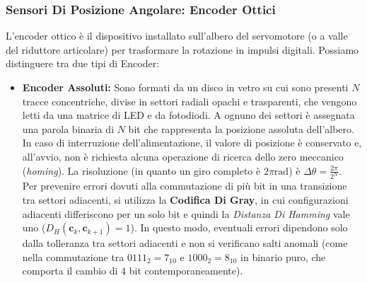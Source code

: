 ﻿\documentclass[11pt, a4paper]{article}
\begin{document}
\subsubsection{Sensori Di Posizione Angolare: Encoder Ottici}
L'encoder ottico è il dispositivo installato sull'albero del servomotore (o a valle del riduttore articolare) per trasformare la rotazione in impulsi digitali. Possiamo distinguere tra due tipi di Encoder:
\begin{itemize}
    \item \textbf{Encoder Assoluti:} Sono formati da un disco in vetro su cui sono presenti $N$ tracce concentriche, divise in settori radiali opachi e trasparenti, che vengono letti da una matrice di LED e da fotodiodi. A ognuno dei settori è assegnata una parola binaria di $N$ bit che rappresenta la posizione assoluta dell'albero. In caso di interruzione dell'alimentazione, il valore di posizione è conservato e, all'avvio, non è richiesta alcuna operazione di ricerca dello zero meccanico (\textit{homing}). La risoluzione (in quanto un giro completo è $2\pi\text{rad}$) è $\Delta \theta = \frac{2\pi}{2^N}$.\\
    Per prevenire errori dovuti alla commutazione di più bit in una transizione tra settori adiacenti, si utilizza la \textbf{Codifica Di Gray}, in cui configurazioni adiacenti differiscono per un solo bit e quindi la \textit{Distanza Di Hamming} vale uno ($D_H(\boldsymbol{c}_k, \boldsymbol{c}_{k+1}) = 1$). In questo modo, eventuali errori dipendono solo dalla tolleranza tra settori adiacenti e non si verificano salti anomali (come nella commutazione tra $0111_2 = 7_{10}$ e $1000_2 = 8_{10}$ in binario puro, che comporta il cambio di 4 bit contemporaneamente).


\end{itemize}
\end{document}
